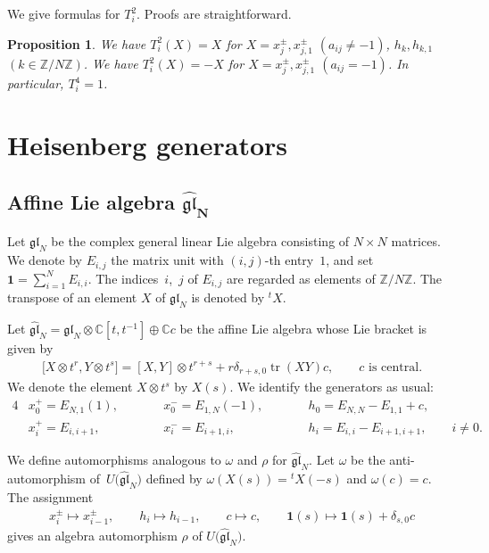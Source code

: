 \documentclass[11pt]{article}
\newtheorem{prop}[thm]{Proposition}
\theoremstyle{definition}
\numberwithin{equation}{section}
\DeclareMathOperator{\tr}{tr}
\newcommand{\bbZ}{\mathbb{Z}}
\newcommand{\bbC}{\mathbb{C}}
\newcommand{\gl}{\mathfrak{gl}}
\newcommand{\bfid}{\mathbf{1}}
\begin{document}
We give formulas for $T_i^2$. Proofs are straightforward.
\begin{prop} We have $T_i^2(X)=X$ for $X=x_{j}^{\pm}, x_{j,1}^{\pm}$ $(a_{ij} \neq -1)$, $h_k, h_{k,1}$ $(k \in \bbZ/N\bbZ)$. We have $T_i^2(X)=-X$ for $X=x_{j}^{\pm}, x_{j,1}^{\pm}$ $(a_{ij} = -1)$. In particular, $T_i^4 = 1$.
\end{prop}


\setcounter{section}{3}
\setcounter{subsection}{4}
\setcounter{subsubsection}{0}
\setcounter{thm}{13}
\setcounter{equation}{0}
\section{Heisenberg generators}\label{section4}

\subsection[Affine Lie algebra $\hat{\gl}_N$]{Affine Lie algebra $\boldsymbol{\hat{\gl}_N}$}
Let $\gl_N$ be the complex general linear Lie algebra consisting of $N \times N$ matrices. We denote by $E_{i,j}$ the matrix unit with $(i,j)$-th entry~$1$, and set $\bfid = \sum\limits_{i=1}^N E_{i,i}$. The indices~$i$,~$j$ of $E_{i,j}$ are regarded as elements of $\bbZ/N\bbZ$. The transpose of an element $X$ of $\gl_N$ is denoted by ${}^t X$.

Let $\hat{\gl}_N = \gl_N \otimes \bbC[t,t^{-1}] \oplus \bbC c$ be the affine Lie algebra whose Lie bracket is given by
\begin{gather*}
\big[X \otimes t^{r}, Y \otimes t^{s}\big] = [X,Y] \otimes t^{r+s} + r \delta_{r+s,0} \tr(XY) c, \qquad \text{$c$ is central}.
\end{gather*}
We denote the element $X \otimes t^s$ by $X(s)$. We identify the generators as usual:
\begin{alignat*}{4}
& x_0^+= E_{N,1}(1), \qquad && x_0^{-} = E_{1,N}(-1), \qquad && h_0= E_{N,N} - E_{1,1} + c,&\\
& x_{i}^{+}= E_{i,i+1}, \qquad && x_i^{-}= E_{i+1,i}, \qquad &&h_i= E_{i,i}-E_{i+1,i+1}, \qquad i \neq 0.&
\end{alignat*}

We define automorphisms analogous to $\omega$ and $\rho$ for $\hat{\gl}_N$. Let $\omega$ be the anti-automorphism of~${U}\big(\hat{\gl}_N\big)$ defined by $\omega(X(s))= {}^{t}X(-s)$ and $\omega(c)=c$.
The assignment
\begin{gather*}
x_i^{\pm} \mapsto x_{i-1}^{\pm}, \qquad h_i \mapsto h_{i-1}, \qquad c \mapsto c, \qquad \bfid(s) \mapsto \bfid(s) + \delta_{s,0}c
\end{gather*}
gives an algebra automorphism $\rho$ of $U\big(\hat{\gl}_N\big)$.
\end{document}
